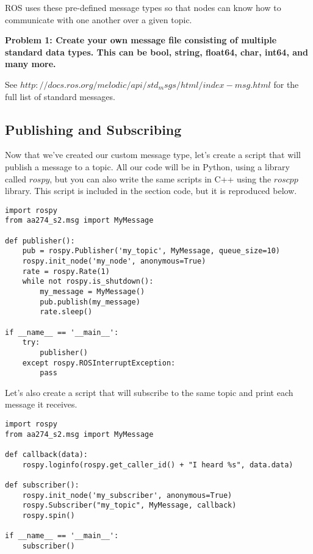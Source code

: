 ROS uses these pre-defined message types so that nodes can know how to communicate with one another over a given topic.

\textbf{Problem 1: Create your own message file consisting of multiple standard data types. This can be bool, string, float64, char, int64, and many more. }

See $http://docs.ros.org/melodic/api/std_msgs/html/index-msg.html$ for the full list of standard messages.


\subsection{Publishing and Subscribing}
Now that we've created our custom message type, let's create a script that will publish a message to a topic. All our code will be in Python, using a library called $rospy$, but you can also write the same scripts in C++ using the $roscpp$ library. This script is included in the section code, but it is reproduced below.


\begin{lstlisting}
import rospy
from aa274_s2.msg import MyMessage

def publisher():
    pub = rospy.Publisher('my_topic', MyMessage, queue_size=10)
    rospy.init_node('my_node', anonymous=True)
    rate = rospy.Rate(1)
    while not rospy.is_shutdown():
        my_message = MyMessage()
        pub.publish(my_message)
        rate.sleep()

if __name__ == '__main__':
    try:
        publisher()
    except rospy.ROSInterruptException:
        pass
\end{lstlisting}


Let's also create a script that will subscribe to the same topic and print each message it receives.

\begin{lstlisting}
import rospy
from aa274_s2.msg import MyMessage

def callback(data):
    rospy.loginfo(rospy.get_caller_id() + "I heard %s", data.data)

def subscriber():
    rospy.init_node('my_subscriber', anonymous=True)
    rospy.Subscriber("my_topic", MyMessage, callback)
    rospy.spin()

if __name__ == '__main__':
    subscriber()
\end{lstlisting}



